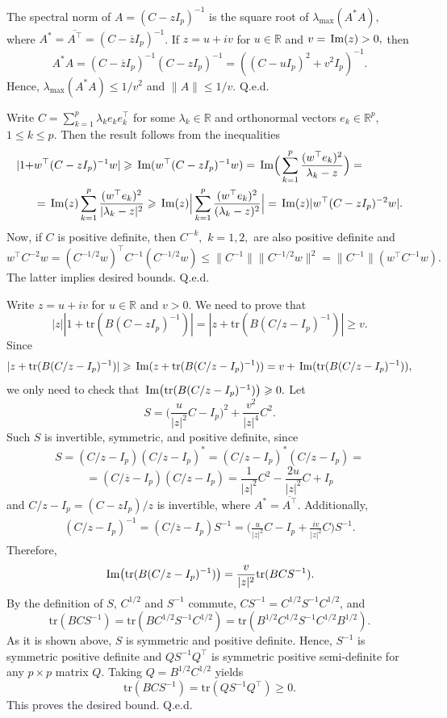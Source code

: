 \documentclass[12pt, a4paper]{article}
\renewcommand\Im{{\rm\,Im} }
\newcommand\bR{{\mathbb R}}
\newcommand\tr{{\mathrm{tr}}}
\begin{document}
 The spectral norm of $A=(C-zI_p)^{-1}$ is the square root of $\lambda_{\max} ( A^*A),$ where $A^*=\overline{A^\top}=(C-\overline{z}I_p)^{-1}$. If $z=u+iv$ for $u\in \bR$ and $v=\Im(z)>0,$ then
\[A^*A=(C-\overline{z}I_p)^{-1}(C-zI_p)^{-1}=((C-uI_p)^2+v^2 I_p)^{-1}.\]
Hence, $\lambda_{\max}(A^*A)\leqslant 1/v^2$ and $\|A\|\leqslant 1/v.$ Q.e.d.

 Write $C=\sum_{k=1}^p\lambda_ke_ke_k^\top$ for some $\lambda_k\in\bR$ and orthonormal vectors $e_k\in\bR^p,$ $1\leqslant k\leqslant p.$ Then the result follows from the inequalities 
\begin{align*} |1+&w^\top (C-zI_p)^{-1} w|\geqslant\Im(w^\top (C-zI_p)^{-1} w)=
\Im\Big(\sum_{k=1}^p \frac{(w^\top e_k)^2}{\lambda_k-z}\Big)=\\
&=\Im (z) \sum_{k=1}^p\frac{(w^\top e_k)^2}{|\lambda_k-z|^2}\geqslant
\Im (z) \Big|\sum_{k=1}^p\frac{(w^\top e_k)^2}{(\lambda_k-z)^2}\Big|=\Im (z)|w^\top (C-zI_p)^{-2} w|.
\end{align*}
Now, if $C$ is positive definite, then $C^{-k},$ $k=1,2,$ are also positive definite and \[w^\top C^{-2} w=(C^{-1/2}w)^\top C^{-1} (C^{-1/2}w)\leqslant \|C^{-1}\|\|C^{-1/2}w\|^2=\|C^{-1}\|(w^\top C^{-1}w).\]
The latter implies desired bounds. Q.e.d.

 Write $z=u+iv$ for $u\in \bR$ and $v>0$. We need to prove that
\[|z||1+\tr(B(C-zI_p)^{-1})|=|z+\tr(B(C/z-I_p)^{-1})|\geqslant v.\]
Since 
\[|z+\tr(B(C/z-I_p)^{-1})|\geqslant \Im(z+\tr(B(C/z-I_p)^{-1}))=v+\Im(\tr(B(C/z-I_p)^{-1})),\]
we only need to check that $\Im\big(\tr(B(C/z-I_p)^{-1})\big)\geqslant0.$
Let
\begin{equation} \label{B}S=\Big(\frac{u}{|z|^2}C-I_p\Big)^2+\frac{v^2}{|z|^4}C^2.\end{equation}
Such $S$ is invertible, symmetric, and positive definite, since \[S=(C/z-I_p)(C/z-I_p)^*=(C/z-I_p)^*(C/z-I_p)=\]\[=
(C/\overline{z}-I_p)(C/z-I_p)=\frac{1}{|z|^2} C^2-\frac{2u}{|z|^2} C+I_p\] and $C/z-I_p=(C-zI_p)/z$ is invertible, where $A^*=\overline{A^\top}$.
Additionally, 
\begin{align*}
(C/z-I_p)^{-1}=(C/\overline{z}-I_p)S^{-1}=\Big(\frac{u}{|z|^2}C-I_p+\frac{iv}{|z|^2} C\Big)S^{-1}.
\end{align*}
Therefore,
\[\Im\big(\tr(B(C/z-I_p)^{-1})\big)=\frac{v}{|z|^2}\tr(B CS^{-1}).\]
By the definition of $S$,  $C^{1/2}$ and $S^{-1}$ commute, $CS^{-1}=C^{1/2}S^{-1}C^{1/2}$, and
\[\tr(B CS^{-1})=\tr(B C^{1/2}S^{-1}C^{1/2})=\tr(B^{1/2} C^{1/2}S^{-1}C^{1/2}B^{1/2}).\]
As it is shown above, $S$ is symmetric and positive definite. Hence, $S^{-1}$ is symmetric positive definite and 
$QS^{-1}Q^\top$ is symmetric positive semi-definite for any $p\times p$ matrix $Q$. Taking $Q=B^{1/2} C^{1/2}$ yields
 \[\tr(B CS^{-1})=\tr(QS^{-1}Q^\top)\geqslant 0.\]
 This proves the desired bound. Q.e.d. 
 
\end{document}
